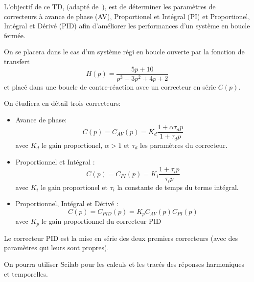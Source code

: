 
L'objectif de ce TD, (adapté de~\cite{Bourles}), est de déterminer les 
paramètres de correcteurs à avance de phase (AV), Proportionel et Intégral (PI) 
et Proportionel, Intégral et Dérivé (PID) afin d'améliorer les performances 
d'un système en boucle fermée.

On se placera dans le cas d'un système régi en boucle ouverte par la fonction 
de transfert
\[
    H(p)=\dfrac{5p+10}{p^3+3p^2+4p+2}
\]
et placé dans une boucle de contre-réaction avec un correcteur en série $C(p)$.
\begin{center}
    
\end{center}
On étudiera en détail trois correcteurs:
\begin{itemize}
    \item Avance de phase: 
\[
    C(p)=C_{AV}(p)=K_d\dfrac{1+\alpha\tau_d p}{1+\tau_d p}
\]
    avec $K_d$ le gain proportionel, $\alpha>1$ et $\tau_d$ les paramètres 
    du correcteur.
    \item Proportionnel et Intégral : 
\[ 
        C(p)=C_{PI}(p)=K_i\dfrac{1+\tau_i p}{\tau_i p}
\]
    avec $K_i$ le gain proportionel et $\tau_i$ la constante de temps du 
    terme intégral.
    \item Proportionnel, Intégral et Dérivé : 
\[
    C(p)=C_{PID}(p)=K_pC_{AV}(p)C_{PI}(p)
\]
    avec $K_p$ le gain proportionnel du correcteur PID
\end{itemize}
Le correcteur PID est la mise en série des deux premiers correcteurs 
(avec des paramètres qui leurs sont propres).

On pourra utiliser Scilab pour les calculs et les tracés des réponses 
harmoniques et temporelles.
\clearpage
